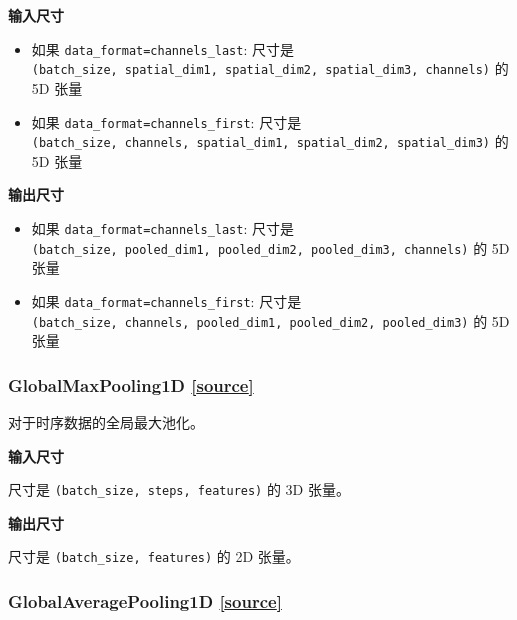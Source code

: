 \textbf{输入尺寸}

\begin{itemize}
\tightlist
\item
  如果
  \texttt{data\_format=\textquotesingle{}channels\_last\textquotesingle{}}:
  尺寸是
  \texttt{(batch\_size,\ spatial\_dim1,\ spatial\_dim2,\ spatial\_dim3,\ channels)}
  的 5D 张量
\item
  如果
  \texttt{data\_format=\textquotesingle{}channels\_first\textquotesingle{}}:
  尺寸是
  \texttt{(batch\_size,\ channels,\ spatial\_dim1,\ spatial\_dim2,\ spatial\_dim3)}
  的 5D 张量
\end{itemize}

\textbf{输出尺寸}

\begin{itemize}
\tightlist
\item
  如果
  \texttt{data\_format=\textquotesingle{}channels\_last\textquotesingle{}}:
  尺寸是
  \texttt{(batch\_size,\ pooled\_dim1,\ pooled\_dim2,\ pooled\_dim3,\ channels)}
  的 5D 张量
\item
  如果
  \texttt{data\_format=\textquotesingle{}channels\_first\textquotesingle{}}:
  尺寸是
  \texttt{(batch\_size,\ channels,\ pooled\_dim1,\ pooled\_dim2,\ pooled\_dim3)}
  的 5D 张量
\end{itemize}




\subsubsection{GlobalMaxPooling1D {\href{https://github.com/keras-team/keras/blob/master/keras/layers/pooling.py\#L470}{{[}source{]}}}}

\begin{Shaded}
\begin{Highlighting}[]
\end{Highlighting}
\end{Shaded}

对于时序数据的全局最大池化。

\textbf{输入尺寸}

尺寸是 \texttt{(batch\_size,\ steps,\ features)} 的 3D 张量。

\textbf{输出尺寸}

尺寸是 \texttt{(batch\_size,\ features)} 的 2D 张量。




\subsubsection{GlobalAveragePooling1D {\href{https://github.com/keras-team/keras/blob/master/keras/layers/pooling.py\#L455}{{[}source{]}}}}

